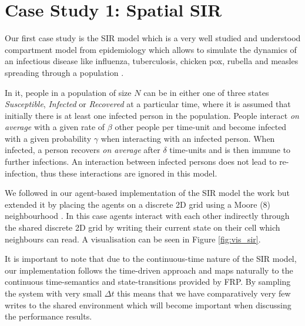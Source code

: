 \section{Case Study 1: Spatial SIR} %
\label{sec:cs_sir}

Our first case study is the SIR model which is a very well studied and understood compartment model from epidemiology \cite{kermack_contribution_1927} which allows to simulate the dynamics of an infectious disease like influenza, tuberculosis, chicken pox, rubella and measles spreading through a population \cite{enns_its_2010}.

In it, people in a population of size $N$ can be in either one of three states \textit{Susceptible}, \textit{Infected} or \textit{Recovered} at a particular time, where it is assumed that initially there is at least one infected person in the population. People interact \textit{on average} with a given rate of $\beta$ other people per time-unit and become infected with a given probability $\gamma$ when interacting with an infected person. When infected, a person recovers \textit{on average} after $\delta$ time-units and is then immune to further infections. An interaction between infected persons does not lead to re-infection, thus these interactions are ignored in this model. 

We followed in our agent-based implementation of the SIR model the work \cite{macal_agent-based_2010} but extended it by placing the agents on a discrete 2D grid using a Moore (8) neighbourhood \cite{thaler_pure_2019}. In this case agents interact with each other indirectly through the shared discrete 2D grid by writing their current state on their cell which neighbours can read. A visualisation can be seen in Figure \ref{fig:vis_sir}.

It is important to note that due to the continuous-time nature of the SIR model, our implementation follows the time-driven \cite{meyer_event-driven_2014} approach and maps naturally to the continuous time-semantics and state-transitions provided by FRP. By sampling the system with very small $\Delta t$ this means that we have comparatively very few writes to the shared environment which will become important when discussing the performance results.

